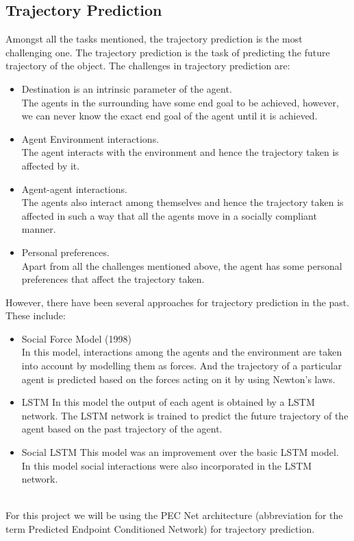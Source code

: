 \documentclass[conference]{IEEEtran}
\begin{document}
\subsection{Trajectory Prediction}
Amongst all the tasks mentioned, the trajectory prediction is the most challenging one. The trajectory prediction is the task of predicting the future trajectory of the object. The challenges in trajectory prediction are:
\begin{itemize}
\item Destination is an intrinsic parameter of the agent.\\
The agents in the surrounding have some end goal to be achieved, however, we can never know the exact end goal of the agent until it is achieved.
\item Agent Environment interactions. \\
The agent interacts with the environment and hence the trajectory taken is affected by it.
\item Agent-agent interactions. \\
The agents also interact among themselves and hence the trajectory taken is affected in such a way that all the agents move in a socially compliant manner.
\item Personal preferences. \\
Apart from all the challenges mentioned above, the agent has some personal preferences that affect the trajectory taken.\\
\end{itemize}
However, there have been several approaches for trajectory prediction in the past. These include:
\begin{itemize}
\item Social Force  Model (1998)\\
In this model, interactions among the agents and the environment are taken into account by modelling them as forces. And the trajectory of a particular agent is predicted based on the forces acting on it by using Newton's laws.
\item LSTM
In this model the output of each agent is obtained by a LSTM network. The LSTM network is trained to predict the future trajectory of the agent based on the past trajectory of the agent.
\item Social LSTM
This model was an improvement over the basic LSTM model. In this model social interactions were also incorporated in the LSTM network.
\end{itemize}
\\
For this project we will be using the PEC Net architecture (abbreviation for the term Predicted Endpoint Conditioned Network) for trajectory prediction.\\
\end{document}
